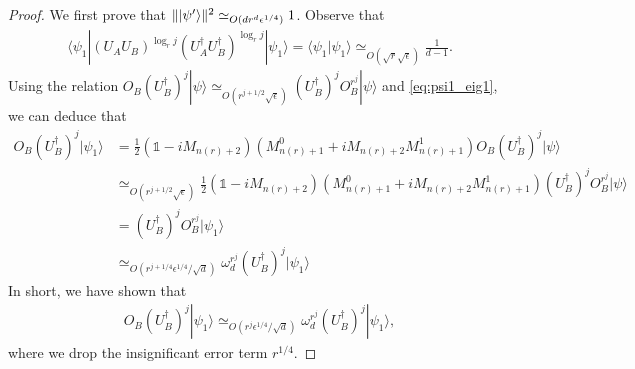 \documentclass[11pt,letterpaper]{article}
\newcommand{\ket}[1]{|#1\rangle}
\newcommand{\bra}[1]{\langle#1|}
\newcommand{\braket}[2]{\langle#1|#2\rangle}
\newcommand{\ct}{^{\dagger}}
\DeclarePairedDelimiter{\norm}{\lVert}{\rVert}
\newcommand{\1}{\mathbb{1}}
\newcommand{\nr}{n(r)}
\newcommand{\se}{\sqrt{\epsilon}}
\newcommand{\qe}{\epsilon^{1/4}}
\newcommand{\sd}{\sqrt{d}}
\newcommand{\sr}{\sqrt{r}}
\newcommand{\appd}[1]{\simeq_{#1}}
\theoremstyle{definition}
\begin{document}
\begin{proof}
	We first prove that $\norm{\ket{\psi'}}^2 \appd{O(d r^d \qe)} 1$.
	Observe that 
	\begin{align*}
		\bra{\psi_1} (U_AU_B)^{\log_r j} (U_A\ct U_B\ct)^{\log_r j}  \ket{\psi_1} =
		\braket{\psi_1}{\psi_1} \appd{O(\sr\se)} \frac{1}{d-1}.
	\end{align*}
	Using the relation $O_B(U_B\ct)^j \ket{\psi} \appd{O(r^{j+1/2} \se)} (U_B\ct)^j O_B^{r^j}\ket{\psi}$ and \cref{eq:psi1_eig1}, we can deduce that 
	\begin{align*}
	    O_B (U_B\ct)^j \ket{\psi_1} &= \frac{1}{2} (\1 - iM_{\nr+2})(M_{\nr+1}^0 + i M_{\nr+2}M_{\nr+1}^1)  O_B (U_B\ct)^j \ket{\psi}\\
	   & \appd{O(r^{j+1/2} \se)} \frac{1}{2} (\1 - iM_{\nr+2})(M_{\nr+1}^0 + i M_{\nr+2}M_{\nr+1}^1) (U_B\ct)^j 
	   O_B^{r^j} \ket{\psi} \\
	   & = (U_B\ct)^j O_B^{r^j} \ket{\psi_1} \\
	   & \appd{O(r^{j+1/4} \qe/ \sd)} \omega_d^{r^j} (U_B\ct)^j\ket{\psi_1}
	\end{align*}
	In short, we have shown that 
    \begin{align}
        \label{eq:B_omega}
        O_B (U_B\ct)^j \ket{\psi_1} \appd{O(r^{j} \qe/ \sd )} \omega_d^{r^j}  (U_B\ct)^j \ket{\psi_1},
    \end{align}
    where we drop the insignificant error term $r^{1/4}$.

\end{proof}
\end{document}
